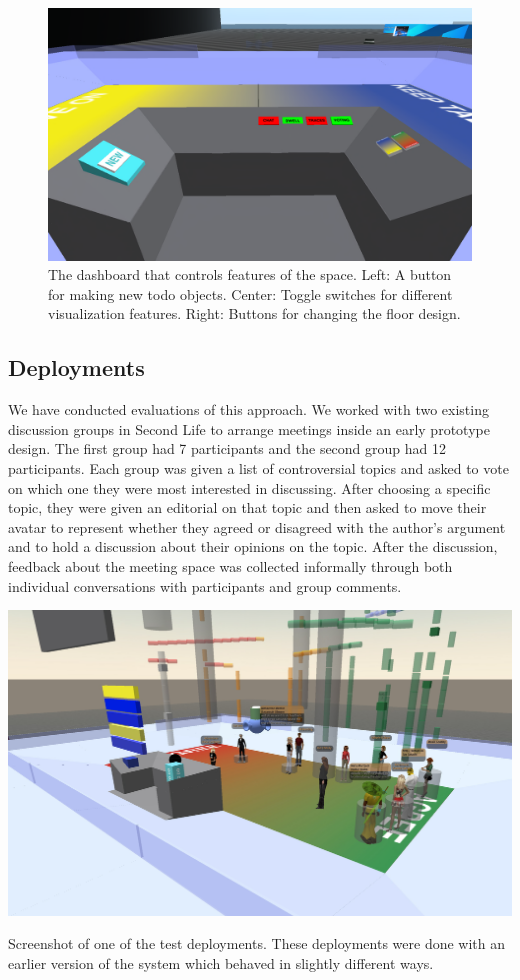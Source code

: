 \begin{figure}[tp]
	\includegraphics{figures/dashboard.png}
	\caption{The dashboard that controls features of the space. Left: A button for making new todo objects. Center: Toggle switches for different visualization features. Right: Buttons for changing the floor design.}
	\label{fig:information_space_dashboard}
\end{figure}


\subsection{Deployments}
We have conducted evaluations of this approach. We worked with two existing discussion groups in Second Life to arrange meetings inside an early prototype design. The first group had 7 participants and the second group had 12 participants. Each group was given a list of controversial topics and asked to vote on which one they were most interested in discussing. After choosing a specific topic, they were given an editorial on that topic and then asked to move their avatar to represent whether they agreed or disagreed with the author's argument and to hold a discussion about their opinions on the topic. After the discussion, feedback about the meeting space was collected informally through both individual conversations with participants and group comments.

\begin{marginfigure}
	\includegraphics{figures/meeting_space_trial_1.jpg}
	\caption{Screenshot of one of the test deployments. These deployments were done with an earlier version of the system which behaved in slightly different ways.}
	\label{fig:meeting_space_trial_1}
\end{marginfigure}

